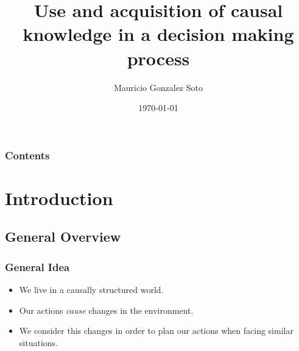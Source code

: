 \documentclass{beamer}
\title[Short title]{Use and acquisition of causal knowledge in a decision making process} %
\author{Mauricio Gonzalez Soto} %
\institute[INAOE] %
{
Instituto Nacional de Astrofísica Óptica y Electrónica \\ %
\medskip
\textit{mauricio@inaoep.mx} %
}
\date{\today} %
\theoremstyle{plain}
\begin{document}
\begin{frame}
\titlepage %
\end{frame}

\begin{frame}[allowframebreaks]
\frametitle{Contents} %
\tableofcontents[hideallsubsections] %
\end{frame}

%


\section{Introduction}
\subsection{General Overview}
\begin{frame}
\frametitle{General Idea}
\begin{itemize}
\item We live in a causally structured world. 
\item Our actions \textit{cause} changes in the environment.
\item We consider this changes in order to plan our actions when facing similar situations.
\end{itemize}
\end{frame}
\end{document}
